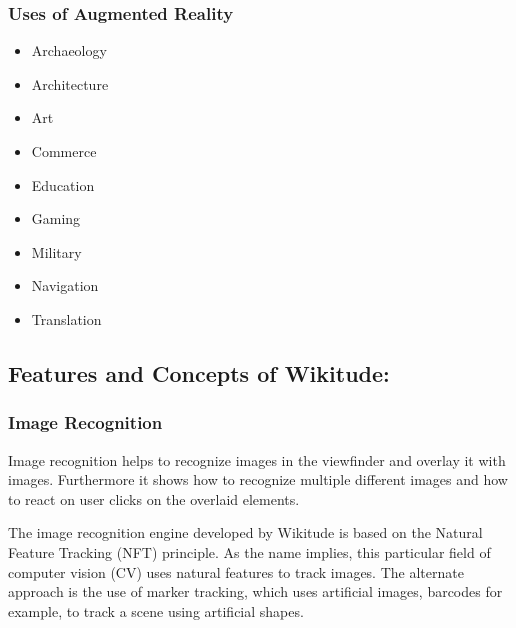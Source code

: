 \documentclass{article}
\begin{document}
\subsubsection{Uses of Augmented Reality}
\begin{itemize}
\item Archaeology
\item Architecture
\item Art
\item Commerce
\item Education
\item Gaming
\item Military
\item Navigation
\item Translation
\end{itemize}


\subsection{ Features and Concepts of Wikitude: }

\subsubsection{Image Recognition }
\par Image recognition helps to recognize images in the viewfinder and overlay it with images. Furthermore it shows how to recognize multiple different images and how to react on user clicks on the overlaid elements. 
\par The image recognition engine developed by Wikitude is based on the Natural Feature Tracking (NFT) principle. As the name implies, this particular field of computer vision (CV) uses natural features to track images. The alternate approach is the use of marker tracking, which uses artificial images, barcodes for example, to track a scene using artificial shapes. 
\end{document}
